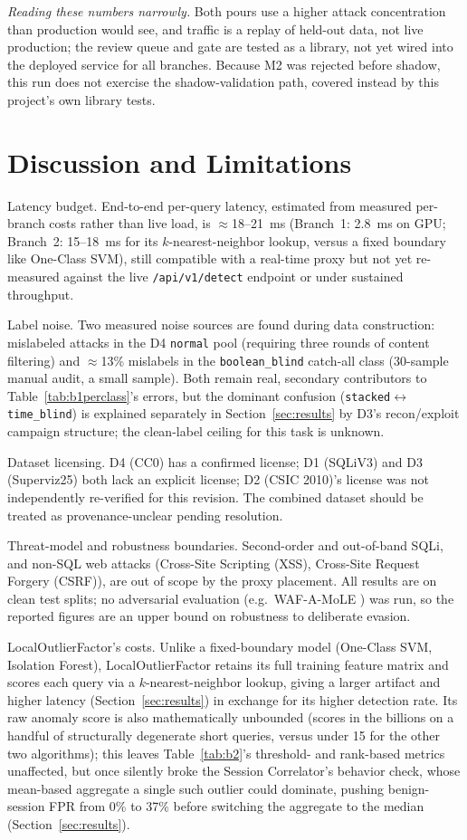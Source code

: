 \documentclass[conference]{IEEEtran}
\begin{document}
\emph{Reading these numbers narrowly.} Both pours use a higher attack concentration than production would see, and traffic is a replay of held-out data, not live production; the review queue and gate are tested as a library, not yet wired into the deployed service for all branches. Because M2 was rejected before shadow, this run does not exercise the shadow-validation path, covered instead by this project's own library tests.

\section{Discussion and Limitations}\label{sec:discussion}
Latency budget. End-to-end per-query latency, estimated from measured per-branch costs rather than live load, is $\approx$18--21~ms (Branch~1: 2.8~ms on GPU; Branch~2: 15--18~ms for its $k$-nearest-neighbor lookup, versus a fixed boundary like One-Class SVM), still compatible with a real-time proxy but not yet re-measured against the live \texttt{/api/v1/detect} endpoint or under sustained throughput.

Label noise. Two measured noise sources are found during data construction: mislabeled attacks in the D4 \texttt{normal} pool (requiring three rounds of content filtering) and $\approx$13\% mislabels in the \texttt{boolean\_blind} catch-all class (30-sample manual audit, a small sample). Both remain real, secondary contributors to Table~\ref{tab:b1perclass}'s errors, but the dominant confusion (\texttt{stacked}$\leftrightarrow$\texttt{time\_blind}) is explained separately in Section~\ref{sec:results} by D3's recon/exploit campaign structure; the clean-label ceiling for this task is unknown.

Dataset licensing. D4 (CC0) has a confirmed license; D1 (SQLiV3) and D3 (Superviz25) both lack an explicit license; D2 (CSIC 2010)'s license was not independently re-verified for this revision. The combined dataset should be treated as provenance-unclear pending resolution.

Threat-model and robustness boundaries. Second-order and out-of-band SQLi, and non-SQL web attacks (Cross-Site Scripting (XSS), Cross-Site Request Forgery (CSRF)), are out of scope by the proxy placement. All results are on clean test splits; no adversarial evaluation (e.g.\ WAF-A-MoLE \cite{b11}) was run, so the reported figures are an upper bound on robustness to deliberate evasion.

LocalOutlierFactor's costs. Unlike a fixed-boundary model (One-Class SVM, Isolation Forest), LocalOutlierFactor retains its full training feature matrix and scores each query via a $k$-nearest-neighbor lookup, giving a larger artifact and higher latency (Section~\ref{sec:results}) in exchange for its higher detection rate. Its raw anomaly score is also mathematically unbounded (scores in the billions on a handful of structurally degenerate short queries, versus under 15 for the other two algorithms); this leaves Table~\ref{tab:b2}'s threshold- and rank-based metrics unaffected, but once silently broke the Session Correlator's behavior check, whose mean-based aggregate a single such outlier could dominate, pushing benign-session FPR from 0\% to 37\% before switching the aggregate to the median (Section~\ref{sec:results}).
\end{document}
